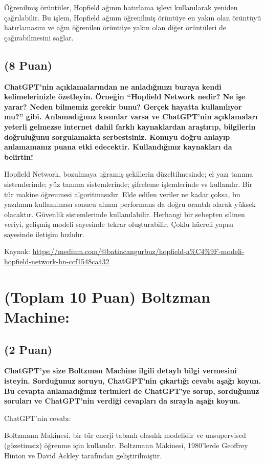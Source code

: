 \documentclass[11pt]{article}
\begin{document}
Öğrenilmiş örüntüler, Hopfield ağının hatırlama işlevi kullanılarak yeniden çağrılabilir. Bu işlem, Hopfield ağının öğrenilmiş örüntüye en yakın olan örüntüyü hatırlamasını ve ağın öğrenilen örüntüye yakın olan diğer örüntüleri de çağırabilmesini sağlar.

\subsection{(8 Puan)} \textbf{ChatGPT’nin açıklamalarından ne anladığınızı buraya kendi kelimelerinizle özetleyin. Örneğin ``Hopfield Network nedir? Ne işe yarar? Neden bilmemiz gerekir bunu? Gerçek hayatta kullanılıyor mu?'' gibi. Anlamadığınız kısımlar varsa ve ChatGPT’nin açıklamaları yeterli gelmezse internet dahil farklı kaynaklardan araştırıp, bilgilerin doğruluğunu sorgulamakta serbestsiniz. Konuyu doğru anlayıp anlamamanız puana etki edecektir. Kullandığınız kaynakları da belirtin!}

Hopfield Network, bozulmaya uğramış şekillerin düzeltilmesinde; el yazı tanıma sistemlerinde; yüz tanıma sistemlerinde; şifreleme işlemlerinde vs kullanılır. Bir tür makine öğrenmesi algoritmasıdır. Elde edilen veriler ne kadar çoksa, bu yazılımın kullanılması sonucu alınan performans da doğru orantılı olarak yüksek olacaktır. Güvenlik sistemlerinde kullanılabilir. Herhangi bir sebepten silinen veriyi, gelişmiş modeli sayesinde tekrar oluşturabilir. Çoklu hücreli yapısı sayesinde iletişim hızlıdır. 

Kaynak: \url{https://medium.com/@batincangurbuz/hopfield-a%C4%9F-modeli-hopfield-network-hn-ccf1548ca432}

\section{(Toplam 10 Puan) Boltzman Machine:}

\subsection{(2 Puan)} \textbf{ChatGPT’ye size Boltzman Machine ilgili detaylı bilgi vermesini isteyin. Sorduğunuz soruyu, ChatGPT'nin çıkartığı cevabı aşağı koyun. Bu cevapta anlamadığınız terimleri de ChatGPT’ye sorup, sorduğunuz soruları ve ChatGPT’nin verdiği cevapları da sırayla aşağı koyun.}

ChatGPT'nin cevabı:

Boltzmann Makinesi, bir tür enerji tabanlı olasılık modelidir ve unsupervised (gözetimsiz) öğrenme için kullanılır. Boltzmann Makinesi, 1980'lerde Geoffrey Hinton ve David Ackley tarafından geliştirilmiştir.
\end{document}
